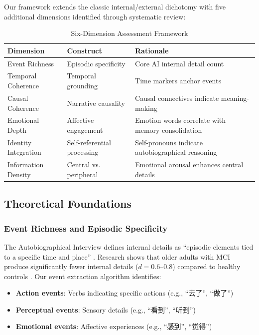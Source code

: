 \documentclass{article}
\begin{document}
Our framework extends the classic internal/external dichotomy \cite{levine2002} with five additional dimensions identified through systematic review:

\begin{table}[h]
\centering
\caption{Six-Dimension Assessment Framework}
\label{tab:dimensions}
\begin{tabular}{lll}
\toprule
\textbf{Dimension} & \textbf{Construct} & \textbf{Rationale} \\
\midrule
Event Richness & Episodic specificity & Core AI internal detail count \cite{levine2002, irish2024} \\
Temporal Coherence & Temporal grounding & Time markers anchor events \cite{chen2021, li2025} \\
Causal Coherence & Narrative causality & Causal connectives indicate meaning-making \cite{habermas2024, mcadams2025} \\
Emotional Depth & Affective engagement & Emotion words correlate with memory consolidation \cite{kensinger2024, mcgaugh2025} \\
Identity Integration & Self-referential processing & Self-pronouns indicate autobiographical reasoning \cite{conway2024, adler2025} \\
Information Density & Central vs. peripheral & Emotional arousal enhances central details \cite{kensinger2026, waring2025} \\
\bottomrule
\end{tabular}
\end{table}

\subsection{Theoretical Foundations}

\subsubsection{Event Richness and Episodic Specificity}

The Autobiographical Interview defines internal details as ``episodic elements tied to a specific time and place'' \cite{levine2002}. Research shows that older adults with MCI produce significantly fewer internal details ($d = 0.6$--$0.8$) compared to healthy controls \cite{irish2024, barnhofer2025}. Our event extraction algorithm identifies:
\begin{itemize}
    \item \textbf{Action events}: Verbs indicating specific actions (e.g., ``去了'', ``做了'')
    \item \textbf{Perceptual events}: Sensory details (e.g., ``看到'', ``听到'')
    \item \textbf{Emotional events}: Affective experiences (e.g., ``感到'', ``觉得'')
\end{itemize}
\end{document}
